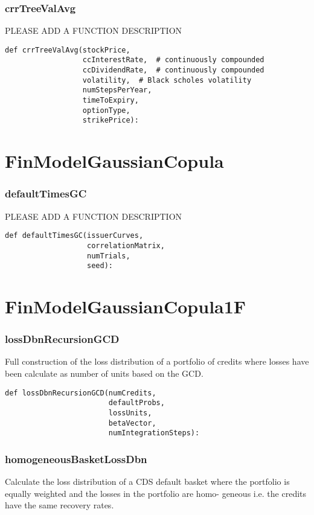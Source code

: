 \documentclass[twoside,11pt]{book}
\begin{document}
\subsubsection*{{\bf crrTreeValAvg}}
PLEASE ADD A FUNCTION DESCRIPTION

\begin{lstlisting}
def crrTreeValAvg(stockPrice,
                  ccInterestRate,  # continuously compounded
                  ccDividendRate,  # continuously compounded
                  volatility,  # Black scholes volatility
                  numStepsPerYear,
                  timeToExpiry,
                  optionType,
                  strikePrice):
\end{lstlisting}

\newpage
\section{FinModelGaussianCopula}

\subsubsection*{{\bf defaultTimesGC}}
PLEASE ADD A FUNCTION DESCRIPTION

\begin{lstlisting}
def defaultTimesGC(issuerCurves,
                   correlationMatrix,
                   numTrials,
                   seed):
\end{lstlisting}

\newpage
\section{FinModelGaussianCopula1F}

\subsubsection*{{\bf lossDbnRecursionGCD}}
Full construction of the loss distribution of a portfolio of credits where losses have been calculate as number of units based on the GCD.  

\begin{lstlisting}
def lossDbnRecursionGCD(numCredits,
                        defaultProbs,
                        lossUnits,
                        betaVector,
                        numIntegrationSteps):
\end{lstlisting}

\subsubsection*{{\bf homogeneousBasketLossDbn}}
Calculate the loss distribution of a CDS default basket where the portfolio is equally weighted and the losses in the portfolio are homo- geneous i.e. the credits have the same recovery rates.  
\end{document}
